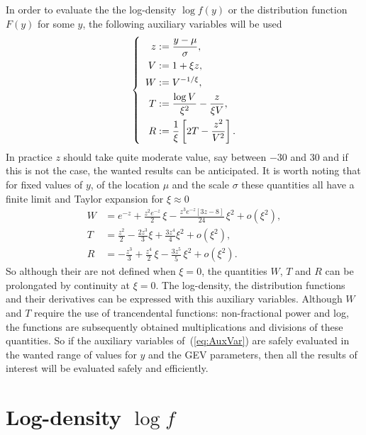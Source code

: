 In order to evaluate the the log-density $\log f(y)$ or the
distribution function $F(y)$ for some $y$,  the following auxiliary variables
will be used
\begin{equation}
  \label{eq:AuxVar}
  \left\{ \rule{0.5em}{0em}
  \begin{aligned}
    z &:= \frac{y - \mu}{\sigma}, \\
    V &:= 1 + \xi z, \\
    W &:= V^{-1/\xi},\\
    T &:= \frac{\log V}{\xi^2} - \frac{z}{\xi V},\\
    R &:= \frac{1}{\xi} \left[2T - \frac{z^2}{V^2} \right].
  \end{aligned}
  \right.
\end{equation}
In practice $z$ should take quite moderate value, say between $-30$
and $30$ and if this is not the case, the wanted results can be
anticipated.  It is worth noting that for fixed values of $y$, of the
location $\mu$ and the scale $\sigma$ these quantities all have a
finite limit and Taylor expansion for $\xi \approx 0$
\begin{equation*}
  \begin{aligned}
    W
    &= e^{-z} + \frac{z^2e^{-z}}{2} \, \xi - \frac{z^3e^{-z} [3z -8]}{24}  \, \xi^2  + o(\xi^2),\\
    T
    &= \frac{z^2}{2} - \frac{2z^3}{3} \xi + \frac{3z^4}{4}\xi^2 + o(\xi^2),\\
    R
    &= -\frac{z^3}{3} + \frac{z^4}{2} \, \xi - \frac{3z^5}{5}\,\xi^2 + o(\xi^2). 
  \end{aligned}
\end{equation*}
So although their are not defined when $\xi = 0$, the quantities $W$,
$T$ and $R$ can be prolongated by continuity at $\xi = 0$. The
log-density, the distribution functions and their derivatives can be
expressed with this auxiliary variables. Although $W$ and $T$ require
the use of trancendental functions: non-fractional power and log, the
functions are subsequently obtained multiplications and divisions of
these quantities. So if the auxiliary variables of~(\ref{eq:AuxVar})
are safely evaluated in the wanted range of values for $y$ and the GEV
parameters, then all the results of interest will be evaluated safely
and efficiently.


\section{Log-density $\log f$}

